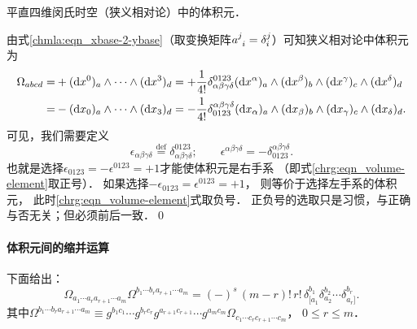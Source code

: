 \begin{example}\label{chrg:exam_RV}
	平直四维闵氏时空（狭义相对论）中的体积元．
\end{example}
由式\eqref{chmla:eqn_xbase-2-ybase}（取变换矩阵$a^{j}_{\hphantom{j}i}=\delta^j_i$）可知狭义相对论中体积元为
\begin{align*}
	\Omega_{abcd}=&+ ({\rm d}x^0)_{a} \wedge\cdots \wedge({\rm d}x^3)_{d} 
	=+\frac{1}{4!}\delta_{\alpha\beta\gamma\delta}^{0123}  ({\rm d}x^{\alpha})_{a} \wedge 
	({\rm d}x^{\beta})_{b} \wedge ({\rm d}x^{\gamma})_{c} \wedge({\rm d}x^{\delta})_{d} \\
	=& -({\rm d}x_0)_{a} \wedge \cdots \wedge({\rm d}x_3)_{d} 
	=-\frac{1}{4!}\delta^{\alpha\beta\gamma\delta}_{0123}  ({\rm d}x_{\alpha})_{a} \wedge 
	({\rm d}x_{\beta})_{b} \wedge ({\rm d}x_{\gamma})_{c} \wedge({\rm d}x_{\delta})_{d}.
\end{align*}
可见，我们需要定义
\begin{equation}\label{chrg:eqn_RV}
	\epsilon_{\alpha\beta\gamma\delta} \overset{\mathrm {def}}{=} \delta_{\alpha\beta\gamma\delta}^{0123}; \qquad
	\epsilon^{\alpha\beta\gamma\delta} =- \delta^{\alpha\beta\gamma\delta}_{0123}.
\end{equation}
也就是选择$\epsilon_{0123} = -\epsilon^{0123} = +1$才能使体积元是右手系
（即式\eqref{chrg:eqn_volume-element}取正号）． 
如果选择$-\epsilon_{0123} = \epsilon^{0123} = +1$，
则等价于选择左手系的体积元，
此时\eqref{chrg:eqn_volume-element}式取负号．
正负号的选取只是习惯，与正确与否无关；但必须前后一致．\qed


\paragraph{体积元间的缩并运算} 
下面给出：
\begin{equation}\label{chrg:eqn_VE-contract-VE}
    \boxed{
    \Omega_{a_1 \cdots a_r a_{r+1} \cdots a_m}\Omega^{{b_1 \cdots b_r} a_{r+1} \cdots a_m}
    = (-)^s \, (m-r)! \, r! \, \delta_{\lbrack a_1}^{b_1} \delta_{a_2}^{b_2}\cdots 
    \delta_{a_r \rbrack}^{b_r}   .  }
\end{equation}
其中$\Omega^{{b_1 \cdots b_r} a_{r+1} \cdots a_m}\equiv g^{b_{1}c_{1}} \cdots g^{b_{r}c_{r}}
g^{a_{r+1}c_{r+1}} \cdots g^{a_{m}c_{m}}\Omega_{c_1 \cdots c_r c_{r+1} \cdots c_m}$，
$0\leqslant r \leqslant m$．

